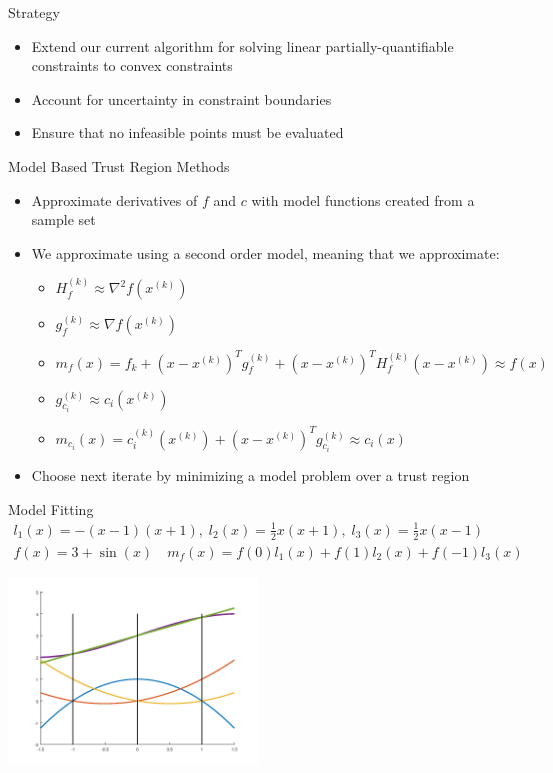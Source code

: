 \documentclass{beamer}
\newcommand{\xk}{{{x}^{(k)}}}
\newcommand{\mk}{{m_f}}
\newcommand{\fk}{{f_k}}
\newcommand{\fgk}{{g^{(k)}_f}}
\newcommand{\fhk}{{H^{(k)}_f}}
\newcommand{\ck}{{c^{(k)}_{i}(\xk)}}
\newcommand{\cgk}{{g^{(k)}_{c_i}}}
\newcommand{\mck}{{m_{c_i}}}
\begin{document}
\begin{frame}{Strategy}
    \begin{itemize}
        \item Extend our current algorithm for solving linear partially-quantifiable constraints to convex constraints
        \item Account for uncertainty in constraint boundaries
        \item Ensure that no infeasible points must be evaluated
    \end{itemize}
\end{frame}





\begin{frame}{Model Based Trust Region Methods}
    \begin{itemize}
        \setlength\itemsep{2em}
    	\item Approximate derivatives of $f$ and $c$ with model functions created from a sample set
    	\item We approximate using a second order model, meaning that we approximate:
    	\begin{itemize}
            \item $\fhk \approx \nabla ^2 f(\xk)$
            \item $\fgk \approx \nabla f(\xk)$
            \item $\mk(x) = \fk + \left(x - \xk \right)^T\fgk + \left(x - \xk \right)^T\fhk\left(x - \xk \right) \approx f(x)$
            \item $\cgk \approx c_i(\xk)$
            \item $\mck(x) = \ck + \left(x - \xk\right)^T\cgk \approx c_i(x)$
    	\end{itemize}
	    \item Choose next iterate by minimizing a model problem over a trust region
	\end{itemize}
\end{frame}


\begin{frame}{Model Fitting}
	\begin{align*}
		l_1(x) = -(x-1)(x+1), \;
		l_2(x) = \frac 1 2 x(x+1), \;
		l_3(x) = \frac 1 2 x(x-1) \\
		f(x) = 3 + \sin(x) \quad
		m_f(x) = f(0)l_1(x) + f(1)l_2(x) + f(-1)l_3(x)
	\end{align*}
	\begin{center}
		\includegraphics[width=250px]{images/lagrange_polynomials.png}
	\end{center}
\end{frame}
\end{document}
